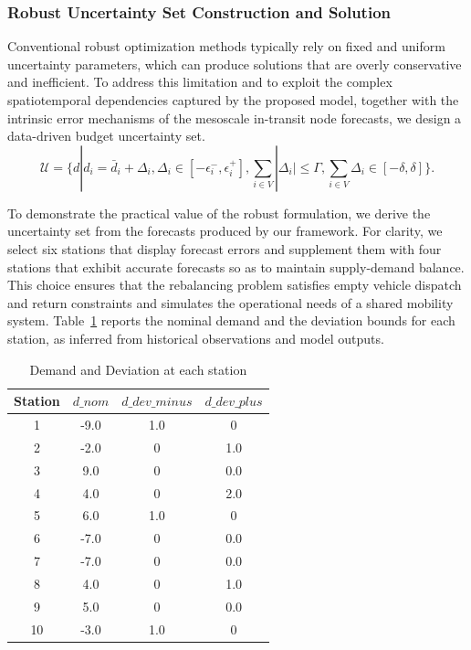 \documentclass[preprint,12pt,authoryear]{elsarticle}
\begin{document}
\subsubsection{Robust Uncertainty Set Construction and Solution}
Conventional robust optimization methods typically rely on fixed and uniform uncertainty parameters, which can produce solutions that are overly conservative and inefficient. To address this limitation and to exploit the complex spatiotemporal dependencies captured by the proposed model, together with the intrinsic error mechanisms of the mesoscale in-transit node forecasts, we design a data-driven budget uncertainty set.
\begin{equation}
    \mathcal{U}=\biggl\{d|d_i = \bar{d}_i+\Delta_i,\Delta_i\in[-\epsilon_i^-,\epsilon_i^+],\sum_{i\in V} |\Delta_i | \leq \Gamma ,\sum_{i\in V}\Delta_i\in [-\delta,\delta] \biggr\}.
\end{equation}

To demonstrate the practical value of the robust formulation, we derive the uncertainty set from the forecasts produced by our framework. For clarity, we select six stations that display forecast errors and supplement them with four stations that exhibit accurate forecasts so as to maintain supply-demand balance. This choice ensures that the rebalancing problem satisfies empty vehicle dispatch and return constraints and simulates the operational needs of a shared mobility system. Table~\ref{tab4} reports the nominal demand and the deviation bounds for each station, as inferred from historical observations and model outputs.
\begin{table}[H]
    \centering
    \caption{Demand and Deviation at each station}\label{tab4}
    \begin{tabular}{c|c|c|c}
    \hline
    Station & $d\_nom$ & $d\_dev\_minus$ & $d\_dev\_plus$ \\
    \hline
    1 & -9.0 & 1.0 & 0 \\
    2 & -2.0 & 0 & 1.0 \\
    3 & 9.0 & 0 & 0.0 \\
    4 & 4.0 & 0 & 2.0 \\
    5 & 6.0 & 1.0 & 0 \\
    6 & -7.0 & 0 & 0.0 \\
    7 & -7.0 & 0 & 0.0 \\
    8 & 4.0 & 0 & 1.0 \\
    9 & 5.0 & 0 & 0.0 \\
    10 & -3.0 & 1.0 & 0 \\
    \hline
\end{tabular}
\end{table}
\end{document}
